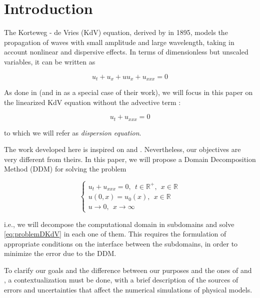 \section{Introduction}

\indent The Korteweg - de Vries (KdV) equation, derived by \cite{kdv1895} in 1895, models the propagation of waves with small amplitude and large wavelength, taking in account nonlinear and dispersive effects. In terms of dimensionless but unscaled variables, it can be written as \cite{BBM1971}

\begin{equation}
	u_t + u_x + uu_x + u_{xxx} = 0
\end{equation}

\indent As done in \cite{zheng2008} (and in \cite{besse2015} as a special case of their work), we will focus in this paper on the linearized KdV equation without the advective term : 

\begin{equation}
 \label{eq:DKdV}
	u_t  + u_{xxx} = 0
\end{equation}

\noindent to which we will refer as \emph{dispersion equation}.

\indent The work developed here is inspired on \cite{zheng2008} and \cite{besse2015}. Nevertheless, our objectives are very different from theirs. In this paper, we will propose a Domain Decomposition Method (DDM) for solving the problem

\begin{equation}
 \label{eq:problemDKdV}
\begin{cases}
	u_t + u_{xxx} = 0, \ \ t \in \mathbb{R}^+, \ \ x \in \mathbb{R} \\
	u(0,x) = u_0(x), \ \ x \in \mathbb{R} \\
	u \longrightarrow 0, \ \ x \longrightarrow \infty
\end{cases}
\end{equation}

\noindent i.e., we will decompose the computational domain in subdomains and solve \eqref{eq:problemDKdV} in each one of them. This requires the formulation of appropriate conditions on the interface between the subdomains, in order to minimize the error due to the DDM.

\indent To clarify our goals and the difference between our purposes and the ones of \cite{zheng2008} and \cite{besse2015}, a contextualization must be done, with a brief description of the sources of errors and uncertainties that affect the numerical simulations of physical models.

